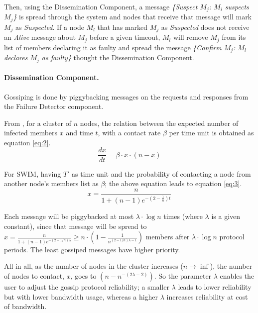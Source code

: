 Then, using the Dissemination Component, a message \textit{\{Suspect $M_{j}$: $M_{i}$ suspects $M_{j}$\}} is spread through the system and nodes that receive that message will mark $M_{j}$ as \textit{Suspected}. If a node $M_{l}$ that has marked $M_{j}$ as \textit{Suspected} does not receive an \textit{Alive} message about $M_{j}$ before a given timeout, $M_{l}$ will remove $M_{j}$ from its list of members declaring it as faulty and spread the message \textit{\{Confirm $M_{j}$: $M_{l}$ declares $M_{j}$ as faulty\}} thought the Dissemination Component.\cite{SWIM}

\paragraph*{Dissemination Component.} Gossiping is done by piggybacking messages on the requests and responses from the Failure Detector component.

From \cite{epidemics}, for a cluster of $n$ nodes, the relation between the expected number of infected members $x$ and time $t$, with a contact rate $\beta$ per time unit is obtained as equation \ref{eq:2}.
\begin{equation}
\label{eq:2}
    \frac{dx}{dt} = \beta \cdot x \cdot (n - x)
\end{equation}

For SWIM, having $T'$ as time unit and the probability of contacting a node from another node's members list as $\beta$; the above equation leads to equation \ref{eq:3}.
\begin{equation}
\label{eq:3}
   x = \frac{n}{1 + (n - 1)e^{-(2- \frac{1}{n})t}}
\end{equation}

Each message will be piggybacked at most $\lambda \cdot \log n$ times (where $\lambda$ is a given constant), since that message will be spread to $ x = \frac{n}{1 + (n - 1)e^{-(2-1/n)\lambda}} \ge n \cdot (1 - \frac{1}{n^{(2-1/n)\lambda-1}}) $ members after $\lambda \cdot \log n$ protocol periods. The least gossiped messages have higher priority.

All in all, as the number of nodes in the cluster increases ($n \rightarrow \inf$), the number of nodes to contact, $x$, goes to $(n - n^{-(2\lambda - 2)})$\cite{SWIM}. So the parameter $\lambda$ enables the user to adjust the gossip protocol reliability; a smaller $\lambda$ leads to lower reliability but with lower bandwidth usage, whereas a higher $\lambda$ increases reliability at cost of bandwidth.

